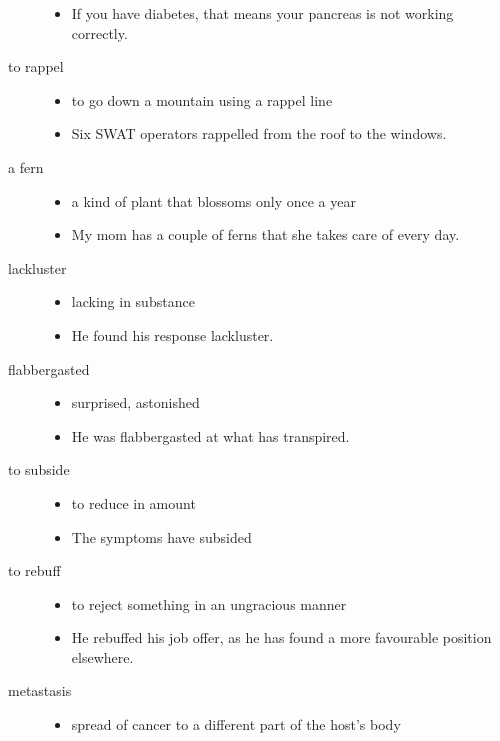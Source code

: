 \documentclass[a4paper]{article}
\begin{document}
\begin{description}
\begin{itemize}
        \item If you have diabetes, that means your pancreas is not working correctly.
    \end{itemize}
    \item[to rappel] \begin{itemize}
        \item to go down a mountain using a rappel line
        \item Six SWAT operators rappelled from the roof to the windows.
    \end{itemize}
    \item[a fern] \begin{itemize}
        \item a kind of plant that blossoms only once a year
        \item My mom has a couple of ferns that she takes care of every day.
    \end{itemize}
    \item[lackluster] \begin{itemize}
        \item lacking in substance
        \item He found his response lackluster.
    \end{itemize}
    \item[flabbergasted] \begin{itemize}
        \item surprised, astonished
        \item He was flabbergasted at what has transpired.
    \end{itemize}
    \item[to subside] \begin{itemize}
        \item to reduce in amount
        \item The symptoms have subsided
    \end{itemize}
    \item[to rebuff] \begin{itemize}
        \item to reject something in an ungracious manner
        \item He rebuffed his job offer, as he has found a more favourable position elsewhere.
    \end{itemize}
    \item[metastasis] \begin{itemize}
        \item spread of cancer to a different part of the host's body

\end{itemize}
\end{description}
\end{document}
